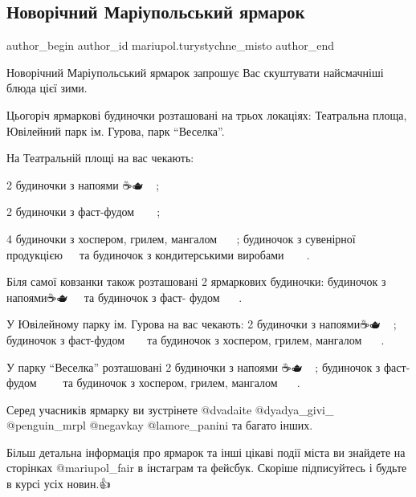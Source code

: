  
 
 
 
 

\subsection{Новорічний Маріупольський ярмарок}
\label{sec:28_12_2021.fb.mariupol.turystychne_misto.2.novorichnyj_jarmarok}

\ifcmt
 author_begin
   author_id mariupol.turystychne_misto
 author_end
\fi

Новорічний  Маріупольський ярмарок запрошує Вас скуштувати найсмачніші блюда цієї зими.🤗

Цьогоріч ярмаркові будиночки розташовані на трьох локаціях: Театральна площа,
Ювілейний парк ім. Гурова, парк \enquote{Веселка}.

На Театральній площі на вас чекають: 

2 будиночки з напоями ☕️🫖🧃🥤🧋🍹; 

2 будиночки з фаст-фудом 🍔🌭🍟🍕🌮🌯;  

4 будиночки з хоспером, грилем, мангалом 🍗🍖🥓🥩🍢;  будиночок з сувенірної продукцією 🔮🎈🎁 та 
будиночок з кондитерськими виробами 🧁🍰🍩🍪🍭🍬.

Біля самої ковзанки також розташовані 2 ярмаркових будиночки: будиночок з напоями☕️🫖🧃🥤🧋🍹 та будиночок з фаст- фудом🍔🌭🍟🍕🌮🌯.

У Ювілейному парку ім. Гурова на вас чекають: 
2 будиночки з напоями☕️🫖🧃🥤🧋🍹; 
будиночок з фаст-фудом🍔🌭🍟🍕🌮🌯 та 
будиночок з хоспером, грилем, мангалом🍗🍖🥓🥩🍢 .

У парку \enquote{Веселка} розташовані 2 будиночки з напоями ☕️🫖🧃🥤🧋🍹; 
будиночок з фаст- фудом 🍔🌭🍟🍕🌮🌯  та будиночок з хоспером, грилем, мангалом🍗🍖🥓🥩🍢 .

Серед учасників ярмарку ви зустрінете  @dvadaite  @dyadya\_givi\_  @penguin\_mrpl @negavkay @lamore\_panini та багато інших.

Більш детальна інформація про ярмарок та інші цікаві події міста ви знайдете на
сторінках @mariupol\_fair в інстаграм та фейсбук. Скоріше підписуйтесь і будьте
в курсі усіх новин.👍

